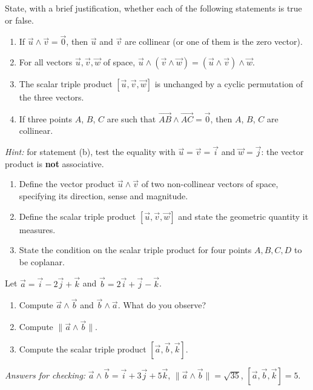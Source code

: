 \documentclass[11pt]{article}
\begin{document}
\begin{exercice}
State, with a brief justification, whether each of the following statements is true or false.
\begin{enumerate}
\item If $\vec{u} \wedge \vec{v} = \vec{0}$, then $\vec{u}$ and $\vec{v}$ are collinear (or one of them is the zero vector).
\item For all vectors $\vec{u}, \vec{v}, \vec{w}$ of space, $\vec{u} \wedge (\vec{v} \wedge \vec{w}) = (\vec{u} \wedge \vec{v}) \wedge \vec{w}$.
\item The scalar triple product $[\vec{u}, \vec{v}, \vec{w}]$ is unchanged by a cyclic permutation of the three vectors.
\item If three points $A$, $B$, $C$ are such that $\vec{AB} \wedge \vec{AC} = \vec{0}$, then $A$, $B$, $C$ are collinear.
\end{enumerate}
\emph{Hint:} for statement (b), test the equality with $\vec{u} = \vec{v} = \vec{i}$ and $\vec{w} = \vec{j}$: the vector product is \textbf{not} associative.
\end{exercice}

\begin{exercice}[Definitions]
\begin{enumerate}
\item Define the vector product $\vec{u} \wedge \vec{v}$ of two non-collinear vectors of space, specifying its direction, sense and magnitude.
\item Define the scalar triple product $[\vec{u}, \vec{v}, \vec{w}]$ and state the geometric quantity it measures.
\item State the condition on the scalar triple product for four points $A, B, C, D$ to be coplanar.
\end{enumerate}
\end{exercice}

\begin{exercice}
Let $\vec{a} = \vec{i} - 2\vec{j} + \vec{k}$ and $\vec{b} = 2\vec{i} + \vec{j} - \vec{k}$.
\begin{enumerate}
\item Compute $\vec{a} \wedge \vec{b}$ and $\vec{b} \wedge \vec{a}$. What do you observe?
\item Compute $\|\vec{a} \wedge \vec{b}\|$.
\item Compute the scalar triple product $[\vec{a}, \vec{b}, \vec{k}]$.
\end{enumerate}
\emph{Answers for checking:} $\vec{a} \wedge \vec{b} = \vec{i} + 3\vec{j} + 5\vec{k}$, $\|\vec{a} \wedge \vec{b}\| = \sqrt{35}$, $[\vec{a}, \vec{b}, \vec{k}] = 5$.
\end{exercice}
\end{document}
